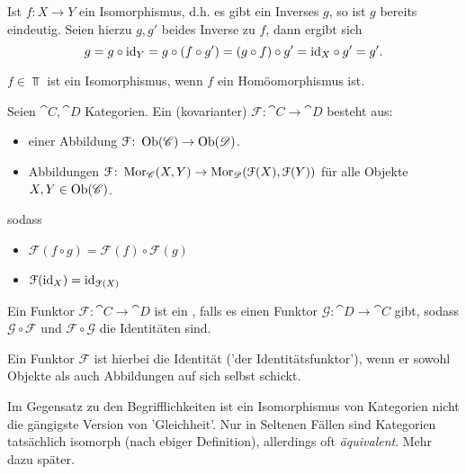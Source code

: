 \begin{recap}
    Ist $f\colon X\to Y$ ein Isomorphismus, d.h. es gibt ein Inverses  $g$, so ist  $g$ bereits eindeutig. Seien hierzu  $g,g'$ beides Inverse zu  $f$, dann ergibt sich
    \[
        g = g \circ  \mathrm{id}_{Y} = g \circ  (f \circ  g') = (g \circ  f) \circ  g' = \mathrm{id}_{X} \circ  g' = g' 
    .\] 
\end{recap}

\begin{example}
    $f\in  \Top$ ist ein Isomorphismus, wenn $f$ ein Homöomorphismus ist.
\end{example}

\begin{definition}[Funktor]\label{def:funktor}
    Seien $\cat{C},\cat{D}$ Kategorien. Ein (kovarianter)  $\mathcal{F} \colon \cat{C} \to  \cat{D}$ besteht aus:
    \begin{itemize}
        \item einer Abbildung $\mathcal{F} \colon \operatorname{Ob}(\mathscr{C}) \to  \operatorname{Ob}(\mathscr{D})$.
        \item Abbildungen $\mathcal{F}\colon \operatorname{Mor}_{\mathscr{C}}(X,Y) \to  \operatorname{Mor}_{\mathscr{D}}(\mathcal{F}(X),\mathcal{F}(Y))$ für alle Objekte $X,Y\in \operatorname{Ob}(\mathscr{C})$.
    \end{itemize}
    sodass
    \begin{itemize}
        \item $\mathcal{F}(f \circ  g) = \mathcal{F}(f) \circ \mathcal{F}(g)$ 
        \item $\mathcal{F}(\mathrm{id}_X) = \mathrm{id}_{\mathcal{F}(X)}$
    \end{itemize}
\end{definition}

\begin{definition}\label{def:funktor-isomorphismus}
    Ein Funktor $\mathcal{F} \colon \cat{C} \to  \cat{D}$ ist ein , falls es einen Funktor $\mathcal{G} \colon \cat{D} \to  \cat{C}$ gibt, sodass $\mathcal{G} \circ  \mathcal{F}$ und $\mathcal{F} \circ  \mathcal{G}$ die Identitäten sind.
\end{definition}
\begin{oral}
    Ein Funktor $\mathcal{F}$ ist hierbei die Identität ('der Identitätsfunktor'), wenn er sowohl Objekte als auch Abbildungen auf sich selbst schickt.
\end{oral}

\begin{doral}
    Im Gegensatz zu den Begrifflichkeiten ist ein Isomorphismus von Kategorien nicht die gängigste Version von 'Gleichheit'. Nur in Seltenen Fällen sind Kategorien tatsächlich isomorph (nach ebiger Definition), allerdings oft \textit{äquivalent}. Mehr dazu später.
\end{doral}

